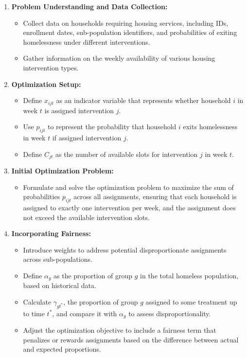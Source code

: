 \documentclass{article}
\begin{document}
\begin{enumerate}
  \item \textbf{Problem Understanding and Data Collection:}
  \begin{itemize}
    \item Collect data on households requiring housing services, including IDs, enrollment dates, sub-population identifiers, and probabilities of exiting homelessness under different interventions.
    \item Gather information on the weekly availability of various housing intervention types.
  \end{itemize}

  \item \textbf{Optimization Setup:}
  \begin{itemize}
    \item Define $x_{ijt}$ as an indicator variable that represents whether household $i$ in week $t$ is assigned intervention $j$.
    \item Use $p_{ijt}$ to represent the probability that household $i$ exits homelessness in week $t$ if assigned intervention $j$.
    \item Define $C_{jt}$ as the number of available slots for intervention $j$ in week $t$.
  \end{itemize}

  \item \textbf{Initial Optimization Problem:}
  \begin{itemize}
    \item Formulate and solve the optimization problem to maximize the sum of probabilities $p_{ijt}$ across all assignments, ensuring that each household is assigned to exactly one intervention per week, and the assignment does not exceed the available intervention slots.
  \end{itemize}

  \item \textbf{Incorporating Fairness:}
  \begin{itemize}
    \item Introduce weights to address potential disproportionate assignments across sub-populations.
    \item Define $\alpha_g$ as the proportion of group $g$ in the total homeless population, based on historical data.
    \item Calculate $\gamma_{gt^*}$, the proportion of group $g$ assigned to some treatment up to time $t^*$, and compare it with $\alpha_g$ to assess disproportionality.
    \item Adjust the optimization objective to include a fairness term that penalizes or rewards assignments based on the difference between actual and expected proportions.
  \end{itemize}


\end{enumerate}
\end{document}
